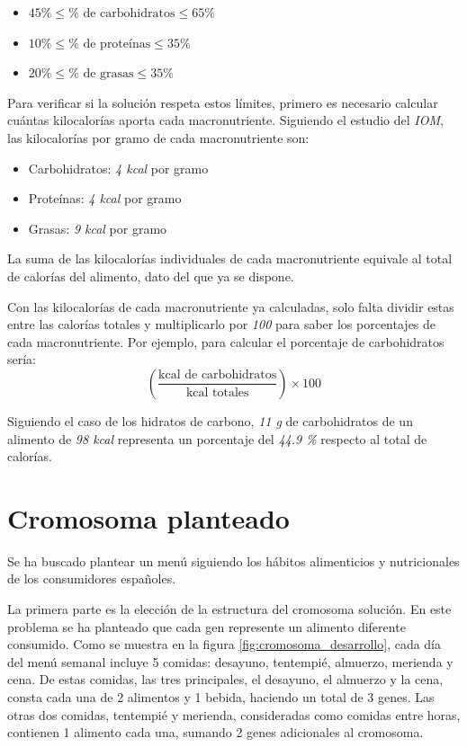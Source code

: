 \begin{itemize}
    \item $45\% \leq \% \text{ de carbohidratos} \leq 65\%$
    \item $10\% \leq \% \text{ de proteínas} \leq 35\%$
    \item $20\% \leq \% \text{ de grasas} \leq 35\%$
\end{itemize}

Para verificar si la solución respeta estos límites, primero es necesario calcular cuántas kilocalorías aporta cada macronutriente. Siguiendo el estudio del \textit{IOM}, las kilocalorías por gramo de cada macronutriente son:

\begin{itemize}
    \item Carbohidratos: \textit{4 kcal} por gramo
    \item Proteínas: \textit{4 kcal} por gramo
    \item Grasas: \textit{9 kcal} por gramo
\end{itemize}

La suma de las kilocalorías individuales de cada macronutriente equivale al total de calorías del alimento, dato del que ya se dispone.

Con las kilocalorías de cada macronutriente ya calculadas, solo falta dividir estas entre las calorías totales y multiplicarlo por \textit{100} para saber los porcentajes de cada macronutriente. Por ejemplo, para calcular el porcentaje de carbohidratos sería:
\[
\left( \frac{\text{kcal de carbohidratos}}{\text{kcal totales}} \right) \times 100
\]

Siguiendo el caso de los hidratos de carbono, \textit{11 g} de carbohidratos de un alimento de \textit{98 kcal} representa un porcentaje del \textit{44.9 \%} respecto al total de calorías.


\section{Cromosoma planteado}
\label{ch:solucion-planteada}

Se ha buscado plantear un menú siguiendo los hábitos alimenticios y nutricionales de los consumidores españoles.

La primera parte es la elección de la estructura del cromosoma solución. En este problema se ha planteado que cada gen represente un alimento diferente consumido. Como se muestra en la figura \ref{fig:cromosoma_desarrollo}, cada día del menú semanal incluye 5 comidas: desayuno, tentempié, almuerzo, merienda y cena. De estas comidas, las tres principales, el desayuno, el almuerzo y la cena, consta cada una de 2 alimentos y 1 bebida, haciendo un total de 3 genes. Las otras dos comidas, tentempié y merienda, consideradas como comidas entre horas, contienen 1 alimento cada una, sumando 2 genes adicionales al cromosoma.


